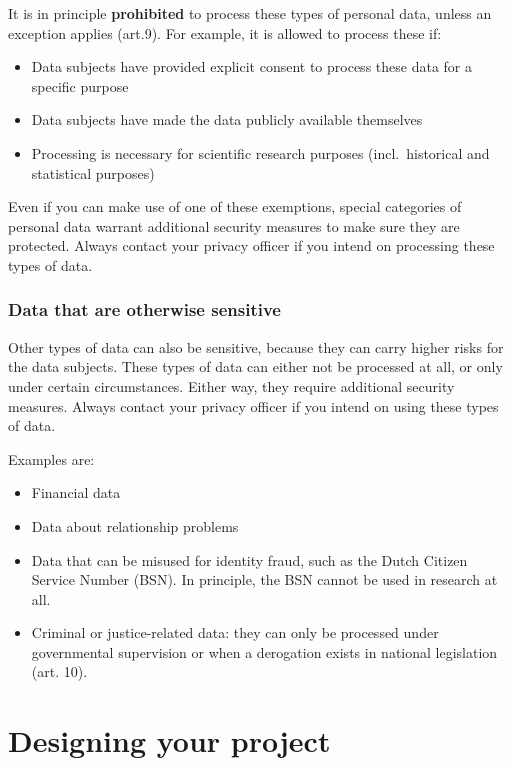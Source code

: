 \documentclass[
]{book}
\providecommand{\tightlist}{%
  \setlength{\itemsep}{0pt}\setlength{\parskip}{0pt}}
\begin{document}
It is in principle \textbf{prohibited} to process these types of personal data,
unless an exception applies
(art.9). For
example, it is allowed to process these if:

\begin{itemize}
\tightlist
\item
  Data subjects have provided explicit consent to process these data for a
  specific purpose
\item
  Data subjects have made the data publicly available themselves
\item
  Processing is necessary for scientific research purposes (incl.~historical
  and statistical purposes)
\end{itemize}

Even if you can make use of one of these exemptions, special categories of
personal data warrant additional security measures to make sure they are
protected. Always contact your
privacy officer
if you intend on processing these types of data.

\hypertarget{data-that-are-otherwise-sensitive}{%
\subsection{Data that are otherwise sensitive}\label{data-that-are-otherwise-sensitive}}

Other types of data can also be sensitive, because they can carry higher risks
for the data subjects. These types of data can either not be processed at all,
or only under certain circumstances. Either way, they require additional
security measures. Always contact your
privacy officer
if you intend on using these types of data.

Examples are:

\begin{itemize}
\tightlist
\item
  Financial data
\item
  Data about relationship problems
\item
  Data that can be misused for identity fraud, such as the Dutch Citizen
  Service Number (BSN). In principle, the BSN cannot be used in research at all.
\item
  Criminal or justice-related data: they can only be processed under
  governmental supervision or when a derogation exists in national legislation
  (art. 10).
\end{itemize}

\hypertarget{privacy-by-design}{%
\chapter{Designing your project}\label{privacy-by-design}}
\end{document}
